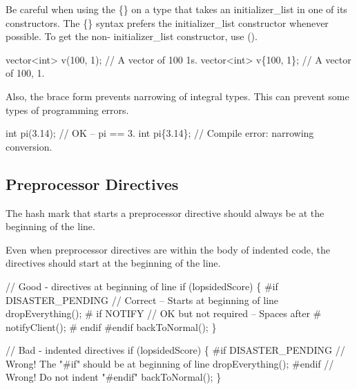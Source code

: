 Be careful when using the {\ttfamily \{\}} on a type that takes an initializer\+\_\+list in one of its constructors. The {\ttfamily \{\}} syntax prefers the initializer\+\_\+list constructor whenever possible. To get the non-\/ initializer\+\_\+list constructor, use {\ttfamily ()}.


\begin{DoxyCode}
vector<int> v(100, 1);  \textcolor{comment}{// A vector of 100 1s.}
vector<int> v\{100, 1\};  \textcolor{comment}{// A vector of 100, 1.}
\end{DoxyCode}


Also, the brace form prevents narrowing of integral types. This can prevent some types of programming errors.


\begin{DoxyCode}
\textcolor{keywordtype}{int} pi(3.14);  \textcolor{comment}{// OK -- pi == 3.}
\textcolor{keywordtype}{int} pi\{3.14\};  \textcolor{comment}{// Compile error: narrowing conversion.}
\end{DoxyCode}


\subsection*{Preprocessor Directives}

The hash mark that starts a preprocessor directive should always be at the beginning of the line.

Even when preprocessor directives are within the body of indented code, the directives should start at the beginning of the line.


\begin{DoxyCode}
\textcolor{comment}{// Good - directives at beginning of line}
  \textcolor{keywordflow}{if} (lopsidedScore) \{
\textcolor{preprocessor}{#if DISASTER\_PENDING      // Correct -- Starts at beginning of line}
    dropEverything();
\textcolor{preprocessor}{# if NOTIFY               // OK but not required -- Spaces after #}
    notifyClient();
\textcolor{preprocessor}{# endif}
\textcolor{preprocessor}{#endif}
    backToNormal();
  \}
\end{DoxyCode}



\begin{DoxyCode}
\textcolor{comment}{// Bad - indented directives}
  \textcolor{keywordflow}{if} (lopsidedScore) \{
\textcolor{preprocessor}{    #if DISASTER\_PENDING  // Wrong!  The "#if" should be at beginning of line}
    dropEverything();
\textcolor{preprocessor}{    #endif                // Wrong!  Do not indent "#endif"}
    backToNormal();
  \}
\end{DoxyCode}


